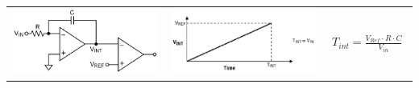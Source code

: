 \begin{tabular}{ccp{4cm}}
\includegraphics[width=6cm, valign=t]{pictures/singleSlope1}
&
\includegraphics[width=6cm, valign=t]{pictures/singleSlope2}
&
  {\begin{align*}
    T_{int}=\frac{V_{Ref} \cdot R \cdot C}{V_{in}}
  \end{align*}}
\\ 
\end{tabular}

